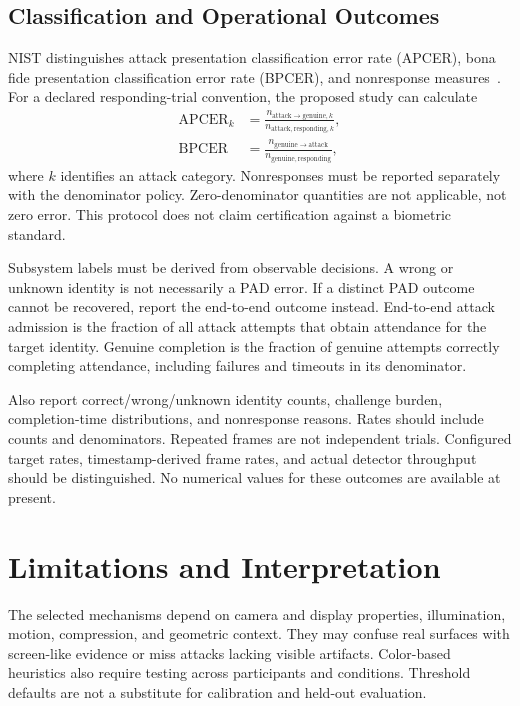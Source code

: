 \documentclass[conference,a4paper]{IEEEtran}
\begin{document}
\subsection{Classification and Operational Outcomes}
NIST distinguishes attack presentation classification error rate (APCER), bona fide presentation classification error rate (BPCER), and nonresponse measures~\cite{nistpad}. For a declared responding-trial convention, the proposed study can calculate
\begin{align}
\mathrm{APCER}_k&=\frac{n_{\mathrm{attack}\rightarrow\mathrm{genuine},k}}{n_{\mathrm{attack,responding},k}},\\
\mathrm{BPCER}&=\frac{n_{\mathrm{genuine}\rightarrow\mathrm{attack}}}{n_{\mathrm{genuine,responding}}},
\end{align}
where $k$ identifies an attack category. Nonresponses must be reported separately with the denominator policy. Zero-denominator quantities are not applicable, not zero error. This protocol does not claim certification against a biometric standard.

Subsystem labels must be derived from observable decisions. A wrong or unknown identity is not necessarily a PAD error. If a distinct PAD outcome cannot be recovered, report the end-to-end outcome instead. End-to-end attack admission is the fraction of all attack attempts that obtain attendance for the target identity. Genuine completion is the fraction of genuine attempts correctly completing attendance, including failures and timeouts in its denominator.

Also report correct/wrong/unknown identity counts, challenge burden, completion-time distributions, and nonresponse reasons. Rates should include counts and denominators. Repeated frames are not independent trials. Configured target rates, timestamp-derived frame rates, and actual detector throughput should be distinguished. No numerical values for these outcomes are available at present.

\section{Limitations and Interpretation}
\balance
The selected mechanisms depend on camera and display properties, illumination, motion, compression, and geometric context. They may confuse real surfaces with screen-like evidence or miss attacks lacking visible artifacts. Color-based heuristics also require testing across participants and conditions. Threshold defaults are not a substitute for calibration and held-out evaluation.
\end{document}
